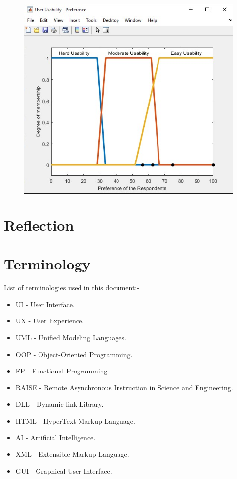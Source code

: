 \documentclass[12pt]{report} %
\begin{document}
		\begin{figure}[H]
			{\includegraphics[scale=0.6]{Figures/VisualPro-Survey-FuzzyLogic/RespondentsPreference.jpg}}
		\end{figure}
		
	\chapter{Reflection}

	\chapter{Terminology}
		List of terminologies used in this document:-
		\begin{itemize}
		\item UI - User Interface.
		\item UX - User Experience.
		\item UML - Unified Modeling Languages.
		\item OOP - Object-Oriented Programming.
		\item FP - Functional Programming.
		\item RAISE - Remote Asynchronous Instruction in Science and Engineering.
		\item DLL - Dynamic-link Library.
		\item HTML - HyperText Markup Language.
		\item AI - Artificial Intelligence.
		\item XML - Extensible Markup Language.
		\item GUI - Graphical User Interface.
		\end{itemize}
\end{document}
